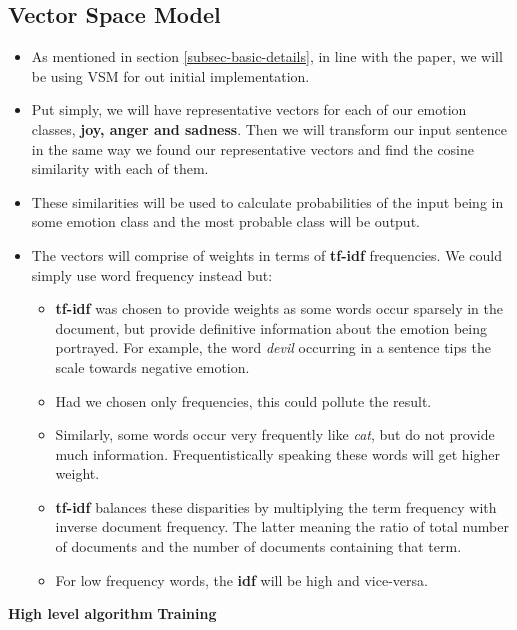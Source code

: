 \subsection{Vector Space Model}
\begin{itemize}
\item As mentioned in section \ref{subsec-basic-details}, in line with the paper, we will be using VSM for out initial implementation.
\item Put simply, we will have representative vectors for each of our emotion classes, \textbf{joy, anger and sadness}. Then we will transform our input sentence in the same way we found our representative vectors and find the cosine similarity with each of them.
\item These similarities will be used to calculate probabilities of the input being in some emotion class and the most probable class will be output.
\item The vectors will comprise of weights in terms of \textbf{tf-idf} frequencies. We could simply use word frequency instead but:
	\begin{itemize}
		\item \textbf{tf-idf} was chosen to provide weights as some words occur sparsely in the document, but provide definitive information about the emotion being portrayed. For example, the word \emph{devil} occurring in a sentence tips the scale towards negative emotion.
		\item Had we chosen only frequencies, this could pollute the result.
		\item Similarly, some words occur very frequently like \emph{cat}, but do not provide much information. Frequentistically speaking these words will get higher weight.
		\item \textbf{tf-idf} balances these disparities by multiplying the term frequency with inverse document frequency. The latter meaning the ratio of total number of documents and the number of documents containing that term.
		\item For low frequency words, the \textbf{idf} will be high and vice-versa.
	\end{itemize}
\end{itemize}
\textbf{High level algorithm}
\label{subsec-high-level-alg}
\textbf{Training}
